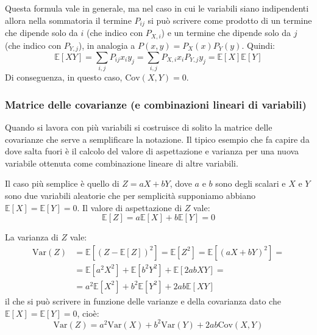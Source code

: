 \documentclass[openany,a4paper,12pt]{book}
\theoremstyle{remark}
\begin{document}
Questa formula vale in generale, ma nel caso in cui le variabili siano indipendenti allora nella sommatoria il termine $P_{ij}$ si può scrivere come prodotto di un termine che dipende solo da $i$ (che indico con $P_{X,i}$) e un termine che dipende solo da $j$ (che indico con $P_{Y,j}$), in analogia a $P(x,y)=P_X(x)P_Y(y)$. Quindi:
\begin{equation*}
    \mathbb{E}[XY] = \sum_{i,j} P_{ij} x_i y_j = \sum_{i,j} P_{X,i} x_i P_{Y,j} y_j = \mathbb{E}[X]\mathbb{E}[Y]
\end{equation*}
Di conseguenza, in questo caso, $\text{Cov}(X,Y) = 0$.
\subsubsection*{Matrice delle covarianze (e combinazioni lineari di variabili)}

Quando si lavora con più variabili si costruisce di solito la matrice delle covarianze che serve a semplificare la notazione. Il tipico esempio che fa capire da dove salta fuori è il calcolo del valore di aspettazione e varianza per una nuova variabile ottenuta come combinazione lineare di altre variabili.

Il caso più semplice è quello di $Z = aX + bY$, dove $a$ e $b$ sono degli scalari e $X$ e $Y$ sono due variabili aleatorie che per semplicità supponiamo abbiano $\mathbb{E}[X] = \mathbb{E}[Y] = 0$.
Il valore di aspettazione di $Z$ vale:
\begin{equation*}
    \mathbb{E}[Z] = a\mathbb{E}[X] + b\mathbb{E}[Y] = 0
\end{equation*}

La varianza di $Z$ vale:
\begin{align*}
    \text{Var}(Z) &= \mathbb{E}[(Z - \mathbb{E}[Z])^2] = \mathbb{E}[Z^2] = \mathbb{E}[(aX + bY)^2] = \\
            &= \mathbb{E}[a^2 X^2] + \mathbb{E}[b^2 Y^2] + \mathbb{E}[2abXY] = \\
            &= a^2 \mathbb{E}[X^2] + b^2 \mathbb{E}[Y^2] + 2ab \mathbb{E}[XY]
\end{align*}
il che si può scrivere in funzione delle varianze e della covarianza dato che $\mathbb{E}[X]=\mathbb{E}[Y]=0$, cioè:
\begin{equation}
\boxed{
    \text{Var}(Z) = a^2 \text{Var}(X) + b^2 \text{Var}(Y) + 2ab \text{Cov}(X,Y)}
\end{equation}
\end{document}
